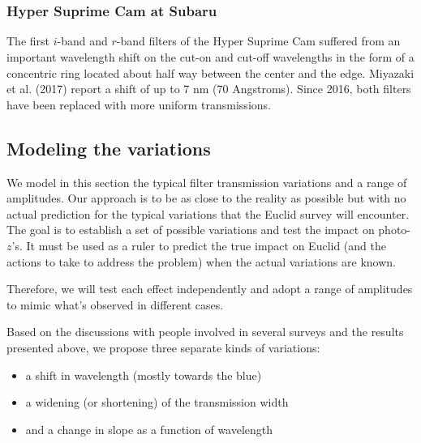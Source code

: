 \documentclass[11pt]{article}
\providecommand{\tightlist}{%
      \setlength{\itemsep}{0pt}\setlength{\parskip}{0pt}}
\begin{document}
    \begin{center}
    \end{center}
    { \hspace*{\fill} \\}
    
    \begin{center}
    \end{center}
    { \hspace*{\fill} \\}
    
    \subsubsection{Hyper Suprime Cam at
Subaru}\label{hyper-suprime-cam-at-subaru}

The first \(i\)-band and \(r\)-band filters of the Hyper Suprime Cam
suffered from an important wavelength shift on the cut-on and cut-off
wavelengths in the form of a concentric ring located about half way
between the center and the edge. Miyazaki et al. (2017) report a shift
of up to 7 nm (70 Angstroms). Since 2016, both filters have been
replaced with more uniform transmissions.

\subsection{Modeling the variations}\label{modeling-the-variations}

We model in this section the typical filter transmission variations and
a range of amplitudes. Our approach is to be as close to the reality as
possible but with no actual prediction for the typical variations that
the Euclid survey will encounter. The goal is to establish a set of
possible variations and test the impact on photo-\(z\)'s. It must be
used as a ruler to predict the true impact on Euclid (and the actions to
take to address the problem) when the actual variations are known.

Therefore, we will test each effect independently and adopt a range of
amplitudes to mimic what's observed in different cases.

Based on the discussions with people involved in several surveys and the
results presented above, we propose three separate kinds of variations:

\begin{itemize}
\tightlist
\item
  a shift in wavelength (mostly towards the blue)
\item
  a widening (or shortening) of the transmission width
\item
  and a change in slope as a function of wavelength
\end{itemize}
\end{document}
